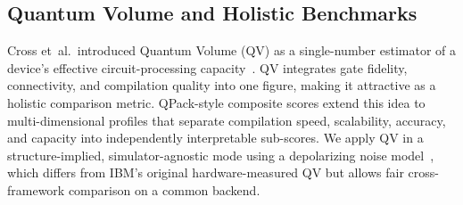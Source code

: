 \subsection{Quantum Volume and Holistic Benchmarks}
Cross et~al.\ introduced Quantum Volume (QV) as a single-number
estimator of a device's effective circuit-processing
capacity~\cite{cross2019validating}.
QV integrates gate fidelity, connectivity, and compilation quality into
one figure, making it attractive as a holistic comparison metric.
QPack-style composite scores extend this idea to multi-dimensional
profiles that separate compilation speed, scalability, accuracy, and
capacity into independently interpretable sub-scores.
We apply QV in a structure-implied, simulator-agnostic mode using a
depolarizing noise model~\cite{nielsen2010quantum}, which differs from
IBM's original hardware-measured QV but allows fair cross-framework
comparison on a common backend.
